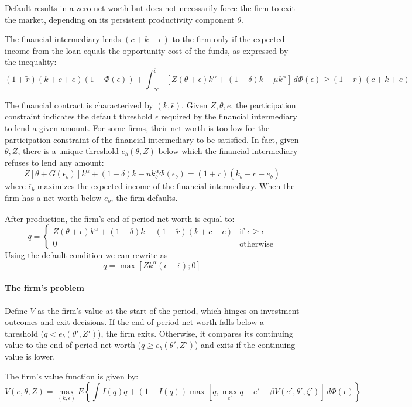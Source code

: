 \documentclass[12pt]{article}
\begin{document}
Default results in a zero net worth but does not necessarily force the firm to exit the market, depending on its
persistent productivity component $\theta$.

The financial intermediary lends $(c + k - e)$ to the firm only if the expected income from the loan equals the
opportunity cost of the funds, as expressed by the inequality:
\[
(1+\widetilde{r} )(k+c+e)(1-\Phi(\overline{\epsilon}))+\int_{-\infty}^{\overline{\epsilon}}[Z(\theta+\overline{\epsilon})
k^\alpha+(1-\delta)k-\mu k^\alpha] \,d\Phi(\epsilon) \geq (1+r)(c+k+e)
\]

The financial contract is characterized by $(k,\overline{\epsilon})$. Given $Z,\theta,e$, the participation constraint
indicates the default threshold $\overline{\epsilon}$ required by the financial intermediary to lend a given amount. For
some firms, their net worth is too low for the participation constraint of the financial intermediary to be satisfied.
In fact, given $\theta, Z$, there is a unique threshold $e_b(\theta,Z)$ below which the financial intermediary
refuses to lend any amount:
\[
Z[\theta+G(\overline{\epsilon}_b )]k^\alpha+(1-\delta)k-uk_b^\alpha\Phi (\overline{\epsilon}_b)=(1+r)(k_b+c-\underline{e_b})
\]
where $\overline{\epsilon}_b$ maximizes the expected income of the financial intermediary. When the firm has a net worth
below $\underline{e_b}$, the firm defaults.

After production, the firm's end-of-period net worth is equal to:
\[
q = \begin{cases}
  Z(\theta+\overline{\epsilon})k^\alpha +(1-\delta)k-(1+\widetilde{r})(k+c-e) & \text{if } \epsilon\geq \overline{\epsilon} \\
  0 & \text{otherwise}
\end{cases}
\]
Using the default condition we can rewrite as 
\[q = \max[Zk^\alpha(\epsilon-\overline{\epsilon});0]\]

\paragraph{The firm's problem}
Define $V$ as the firm's value at the start of the period, which hinges on investment outcomes and exit decisions. If
the end-of-period net worth falls below a threshold ($q < e_b(\theta', Z')$), the firm exits. Otherwise, it compares its
continuing value to the end-of-period net worth ($q \geq e_b(\theta', Z')$) and exits if the continuing value is lower.

The firm's value function is given by:
\[
V(e,\theta,Z) = \max_{(k,\overline{\epsilon})}E\left\{\int I(q)q + (1-I(q))\max[q,\max_{e'}q-e'+\beta V(e',\theta',
\zeta')]\,d\Phi(\epsilon)\right\}
\]
\end{document}
